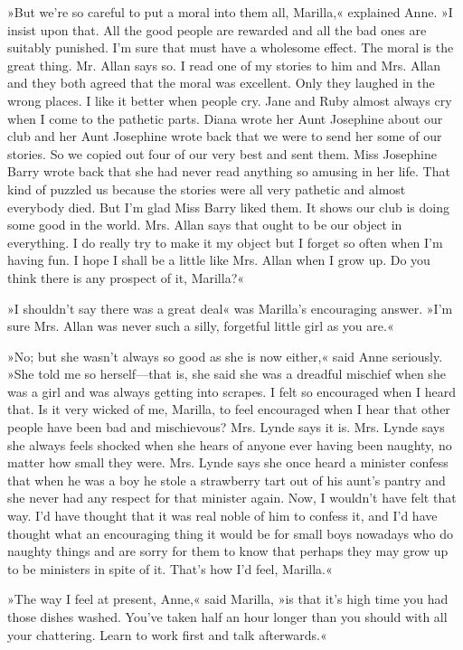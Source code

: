 »But we're so careful to put a moral into them all, Marilla,« explained Anne. »I insist upon that. All the good people are rewarded and all the bad ones are suitably punished. I'm sure that must have a wholesome effect. The moral is the great thing. Mr. Allan says so. I read one of my stories to him and Mrs. Allan and they both agreed that the moral was excellent. Only they laughed in the wrong places. I like it better when people cry. Jane and Ruby almost always cry when I come to the pathetic parts. Diana wrote her Aunt Josephine about our club and her Aunt Josephine wrote back that we were to send her some of our stories. So we copied out four of our very best and sent them. Miss Josephine Barry wrote back that she had never read anything so amusing in her life. That kind of puzzled us because the stories were all very pathetic and almost everybody died. But I'm glad Miss Barry liked them. It shows our club is doing some good in the world. Mrs. Allan says that ought to be our object in everything. I do really try to make it my object but I forget so often when I'm having fun. I hope I shall be a little like Mrs. Allan when I grow up. Do you think there is any prospect of it, Marilla?«

»I shouldn't say there was a great deal« was Marilla's encouraging answer. »I'm sure Mrs. Allan was never such a silly, forgetful little girl as you are.«

»No; but she wasn't always so good as she is now either,« said Anne seriously. »She told me so herself—that is, she said she was a dreadful mischief when she was a girl and was always getting into scrapes. I felt so encouraged when I heard that. Is it very wicked of me, Marilla, to feel encouraged when I hear that other people have been bad and mischievous? Mrs. Lynde says it is. Mrs. Lynde says she always feels shocked when she hears of anyone ever having been naughty, no matter how small they were. Mrs. Lynde says she once heard a minister confess that when he was a boy he stole a strawberry tart out of his aunt's pantry and she never had any respect for that minister again. Now, I wouldn't have felt that way. I'd have thought that it was real noble of him to confess it, and I'd have thought what an encouraging thing it would be for small boys nowadays who do naughty things and are sorry for them to know that perhaps they may grow up to be ministers in spite of it. That's how I'd feel, Marilla.«

»The way I feel at present, Anne,« said Marilla, »is that it's high time you had those dishes washed. You've taken half an hour longer than you should with all your chattering. Learn to work first and talk afterwards.«